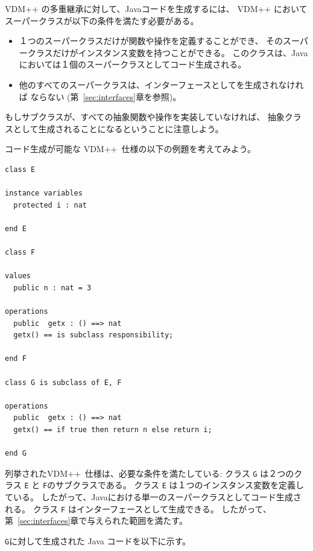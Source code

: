 \documentclass[\pformat,11pt]{jarticle}
\newcommand{\VDM}{VDM++}
\begin{document}
\VDM{} の多重継承に対して、Javaコードを生成するには、
\VDM{} においてスーパークラスが以下の条件を満たす必要がある。

\begin{itemize}
\item １つのスーパークラスだけが関数や操作を定義することができ、
そのスーパークラスだけがインスタンス変数を持つことができる。
このクラスは、Javaにおいては１個のスーパークラスとしてコード生成される。
\item 他のすべてのスーパークラスは、インターフェースとしてを生成されなければ
ならない (第~\ref{sec:interfaces}章を参照)。
\end{itemize}
もしサブクラスが、すべての抽象関数や操作を実装していなければ、
抽象クラスとして生成されることになるということに注意しよう。

コード生成が可能な \VDM\ 仕様の以下の例題を考えてみよう。

\begin{screen}
\begin{small}
\begin{verbatim}
class E

instance variables
  protected i : nat

end E

class F

values
  public n : nat = 3

operations
  public  getx : () ==> nat
  getx() == is subclass responsibility;

end F

class G is subclass of E, F

operations
  public  getx : () ==> nat
  getx() == if true then return n else return i;

end G
\end{verbatim}
\end{small}
\end{screen}

列挙された\VDM\ 仕様は、必要な条件を満たしている:
クラス {\tt G} は２つのクラス {\tt E} と {\tt F}のサブクラスである。
クラス {\tt E} は１つのインスタンス変数を定義している。 
したがって、Javaにおける単一のスーパークラスとしてコード生成される。
クラス {\tt F} はインターフェースとして生成できる。
したがって、第~\ref{sec:interfaces}章で与えられた範囲を満たす。

 \texttt{G}に対して生成された Java コードを以下に示す。
\end{document}

